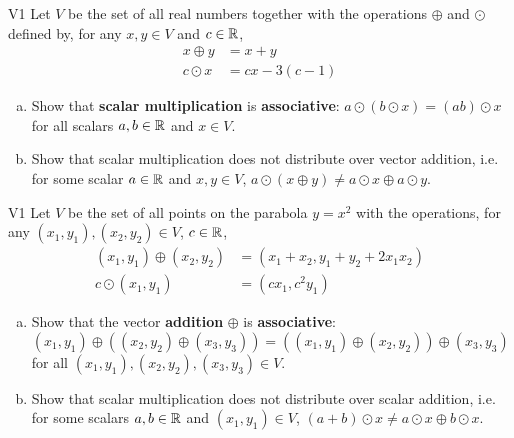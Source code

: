 \begin{problem}{V1}
Let $V$ be the  set of all real numbers together with the operations $\oplus$ and $\odot$ defined by, for any $x,y \in V$ and $c \in \mathbb{R}$,
\begin{align*}
x\oplus y  &= x+y \\
c \odot x &= cx-3(c-1)
\end{align*}
\begin{enumerate}[(a)]
\item Show that \textbf{scalar multiplication} is
      \textbf{associative}: \(a\odot(b\odot x)=(ab)\odot x\) for all scalars $a,b \in \mathbb{R}$ and $x \in V$.
\item Show that scalar multiplication does not distribute over vector addition, i.e. for some scalar $a \in \mathbb{R}$ and $x,y \in V$, $a \odot (x \oplus y) \neq a \odot x \oplus a \odot y$.
\end{enumerate}
\end{problem}

\begin{solution}
\end{solution}


\begin{problem}{V1}
Let $V$ be the set of all points on the parabola $y=x^2$ with the operations, for any $(x_1,y_1), (x_2,y_2) \in V$, $c \in \mathbb{R}$,
\begin{align*}
(x_1,y_1) \oplus (x_2,y_2) &= (x_1+x_2,y_1+y_2+2x_1x_2) \\
c \odot (x_1,y_1) &= (cx_1, c^2y_1)
\end{align*}
\begin{enumerate}[(a)]
\item Show that the vector \textbf{addition} $\oplus$ is \textbf{associative}:
      \((x_1,y_1) \oplus ((x_2,y_2) \oplus (x_3,y_3))=((x_1,y_1)\oplus (x_2,y_2))\oplus (x_3,y_3)\) for all \((x_1,y_1), (x_2,y_2), (x_3,y_3) \in V\).
\item Show that scalar multiplication does not distribute over scalar addition, i.e. for some scalars $a,b \in \mathbb{R}$ and $(x_1,y_1) \in V$, \( (a+b) \odot x \neq a\odot x \oplus b \odot x\).
\end{enumerate}
\end{problem}



